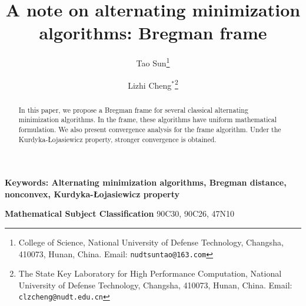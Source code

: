 \documentclass[12pt]{article}
\begin{document}
\title{A note on alternating minimization algorithms: Bregman frame }
\author{Tao Sun\thanks{
College of Science, National University of Defense Technology,
Changsha, 410073, Hunan,  China. Email: \texttt{nudtsuntao@163.com} }
\and Lizhi Cheng$^{*}$\thanks{The State Key Laboratory for High Performance Computation, National University of Defense Technology,
Changsha, 410073, Hunan,  China. Email: \texttt{clzcheng@nudt.edu.cn}}
}


\maketitle

\begin{abstract}
In this paper, we propose a Bregman frame for several classical alternating minimization algorithms. In the frame,  these algorithms have   uniform mathematical formulation. We also present convergence analysis for the frame algorithm. Under the Kurdyka-{\L}ojasiewicz property,  stronger convergence is obtained.
\end{abstract}

\textbf{Keywords: Alternating minimization algorithms, Bregman distance, nonconvex, Kurdyka-{\L}ojasiewicz property}

\textbf{Mathematical Subject Classification} 90C30, 90C26, 47N10
\end{document}
